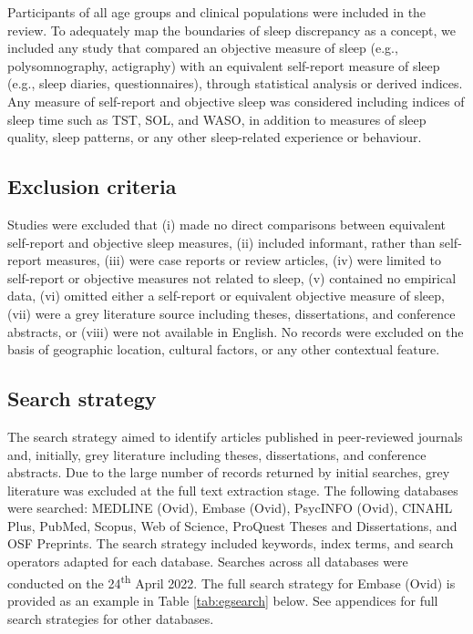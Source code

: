 \documentclass[
]{article}
\begin{document}
Participants of all age groups and clinical populations were included in the review. To adequately map the boundaries of sleep discrepancy as a concept, we included any study that compared an objective measure of sleep (e.g., polysomnography, actigraphy) with an equivalent self-report measure of sleep (e.g., sleep diaries, questionnaires), through statistical analysis or derived indices. Any measure of self-report and objective sleep was considered including indices of sleep time such as TST, SOL, and WASO, in addition to measures of sleep quality, sleep patterns, or any other sleep-related experience or behaviour.

\subsection{Exclusion criteria}\label{exclusion-criteria}

Studies were excluded that (i) made no direct comparisons between equivalent self-report and objective sleep measures, (ii) included informant, rather than self-report measures, (iii) were case reports or review articles, (iv) were limited to self-report or objective measures not related to sleep, (v) contained no empirical data, (vi) omitted either a self-report or equivalent objective measure of sleep, (vii) were a grey literature source including theses, dissertations, and conference abstracts, or (viii) were not available in English. No records were excluded on the basis of geographic location, cultural factors, or any other contextual feature.

\subsection{Search strategy}\label{item7}

The search strategy aimed to identify articles published in peer-reviewed journals and, initially, grey literature including theses, dissertations, and conference abstracts. Due to the large number of records returned by initial searches, grey literature was excluded at the full text extraction stage. The following databases were searched: MEDLINE (Ovid), Embase (Ovid), PsycINFO (Ovid), CINAHL Plus, PubMed, Scopus, Web of Science, ProQuest Theses and Dissertations, and OSF Preprints. The search strategy included keywords, index terms, and search operators adapted for each database. Searches across all databases were conducted on the 24\textsuperscript{th} April 2022. The full search strategy for Embase (Ovid) is provided as an example in Table \ref{tab:egsearch} below. See appendices for full search strategies for other databases.
\end{document}

